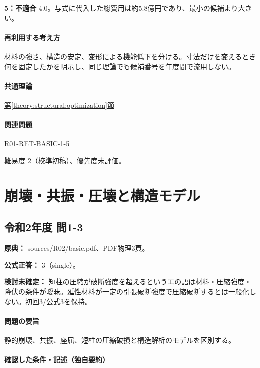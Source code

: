 \noindent\textbf{5：不適合} 4.0。与式に代入した総費用は約5.8億円であり、最小の候補より大きい。\par

\paragraph{再利用する考え方} 材料の強さ、構造の安定、変形による機能低下を分ける。寸法だけを変えるとき何を固定したかを明示し、同じ理論でも候補番号を年度間で流用しない。

\paragraph{共通理論} \hyperref[theory:structural:optimization]{第\ref*{theory:structural:optimization}節}

\paragraph{関連問題} \hyperref[q:r01-ret-basic-1-5]{R01-RET-BASIC-1-5}

\par 難易度 2（校準初稿）、優先度未評価。

\section{崩壊・共振・圧壊と構造モデル}

\subsection{令和2年度 問1-3}
\label{q:r02-reg-basic-1-3}

\noindent\textbf{原典：} sources/R02/basic.pdf、PDF物理3頁。

\textbf{公式正答：} 3（single）。

\par\textbf{検討未確定：} 短柱の圧縮が破断強度を超えるというエの語は材料・圧縮強度・降伏の条件が曖昧。延性材料が一定の引張破断強度で圧縮破断するとは一般化しない。初回3/公式3を保持。

\paragraph{問題の要旨} 静的崩壊、共振、座屈、短柱の圧縮破損と構造解析のモデルを区別する。

\paragraph{確認した条件・記述（独自要約）}\mbox{}\par

